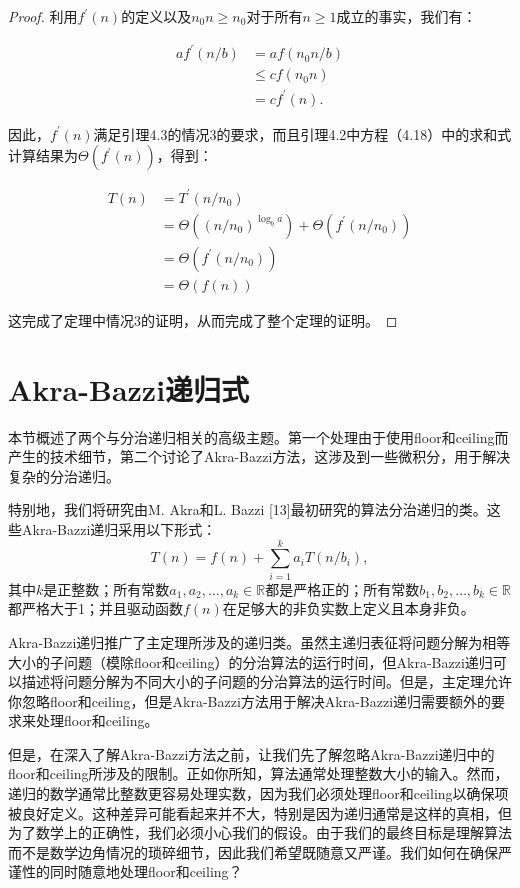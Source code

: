 \documentclass[lang=cn,newtx,10pt,scheme=chinese]{elegantbook}
\begin{document}
\begin{proof}
利用$f^{\prime}(n)$的定义以及$n_0 n \geq n_0$对于所有$n \geq 1$成立的事实，我们有：

$$
\begin{aligned}
a f^{\prime}(n / b) & =a f\left(n_0 n / b\right) \\
& \leq c f\left(n_0 n\right) \\
& =c f^{\prime}(n) .
\end{aligned}
$$

因此，$f^{\prime}(n)$满足引理4.3的情况3的要求，而且引理4.2中方程（4.18）中的求和式计算结果为$\Theta\left(f^{\prime}(n)\right)$，得到：

$$
\begin{aligned}
T(n) & =T^{\prime}\left(n / n_0\right) \\
& =\Theta\left(\left(n / n_0\right)^{\log _b a}\right)+\Theta\left(f^{\prime}\left(n / n_0\right)\right) \\
& =\Theta\left(f^{\prime}\left(n / n_0\right)\right) \\
& =\Theta(f(n))
\end{aligned}
$$

这完成了定理中情况3的证明，从而完成了整个定理的证明。
\end{proof}

\section{Akra-Bazzi递归式}

本节概述了两个与分治递归相关的高级主题。第一个处理由于使用floor和ceiling而产生的技术细节，第二个讨论了Akra-Bazzi方法，这涉及到一些微积分，用于解决复杂的分治递归。

特别地，我们将研究由M. Akra和L. Bazzi [13]最初研究的算法分治递归的类。这些Akra-Bazzi递归采用以下形式：
$$
T(n)=f(n)+\sum_{i=1}^k a_i T\left(n / b_i\right),
$$
其中$k$是正整数；所有常数$a_1, a_2, \ldots, a_k \in \mathbb{R}$都是严格正的；所有常数$b_1, b_2, \ldots, b_k \in \mathbb{R}$都严格大于1；并且驱动函数$f(n)$在足够大的非负实数上定义且本身非负。

Akra-Bazzi递归推广了主定理所涉及的递归类。虽然主递归表征将问题分解为相等大小的子问题（模除floor和ceiling）的分治算法的运行时间，但Akra-Bazzi递归可以描述将问题分解为不同大小的子问题的分治算法的运行时间。但是，主定理允许你忽略floor和ceiling，但是Akra-Bazzi方法用于解决Akra-Bazzi递归需要额外的要求来处理floor和ceiling。

但是，在深入了解Akra-Bazzi方法之前，让我们先了解忽略Akra-Bazzi递归中的floor和ceiling所涉及的限制。正如你所知，算法通常处理整数大小的输入。然而，递归的数学通常比整数更容易处理实数，因为我们必须处理floor和ceiling以确保项被良好定义。这种差异可能看起来并不大，特别是因为递归通常是这样的真相，但为了数学上的正确性，我们必须小心我们的假设。由于我们的最终目标是理解算法而不是数学边角情况的琐碎细节，因此我们希望既随意又严谨。我们如何在确保严谨性的同时随意地处理floor和ceiling？
\end{document}

